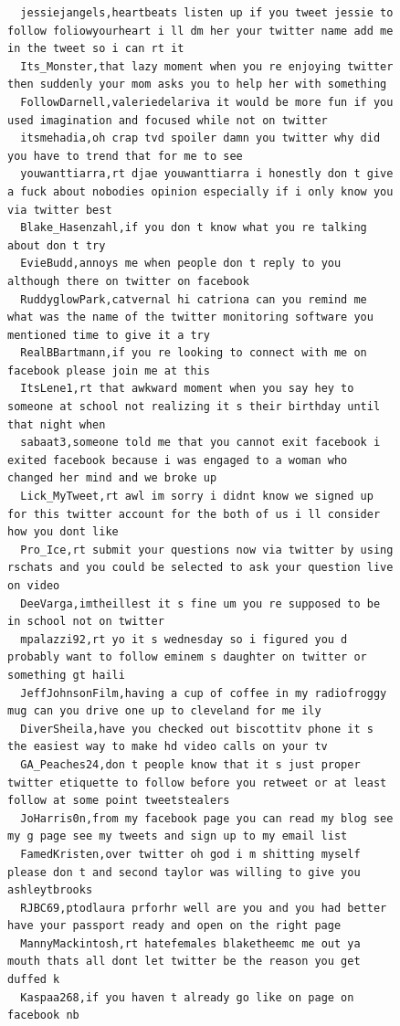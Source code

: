 \begin{figure}[htpb]
\begin{verbatim}
  jessiejangels,heartbeats listen up if you tweet jessie to follow foliowyourheart i ll dm her your twitter name add me in the tweet so i can rt it
  Its_Monster,that lazy moment when you re enjoying twitter then suddenly your mom asks you to help her with something
  FollowDarnell,valeriedelariva it would be more fun if you used imagination and focused while not on twitter
  itsmehadia,oh crap tvd spoiler damn you twitter why did you have to trend that for me to see
  youwanttiarra,rt djae youwanttiarra i honestly don t give a fuck about nobodies opinion especially if i only know you via twitter best
  Blake_Hasenzahl,if you don t know what you re talking about don t try
  EvieBudd,annoys me when people don t reply to you although there on twitter on facebook
  RuddyglowPark,catvernal hi catriona can you remind me what was the name of the twitter monitoring software you mentioned time to give it a try
  RealBBartmann,if you re looking to connect with me on facebook please join me at this
  ItsLene1,rt that awkward moment when you say hey to someone at school not realizing it s their birthday until that night when
  sabaat3,someone told me that you cannot exit facebook i exited facebook because i was engaged to a woman who changed her mind and we broke up
  Lick_MyTweet,rt awl im sorry i didnt know we signed up for this twitter account for the both of us i ll consider how you dont like
  Pro_Ice,rt submit your questions now via twitter by using rschats and you could be selected to ask your question live on video
  DeeVarga,imtheillest it s fine um you re supposed to be in school not on twitter
  mpalazzi92,rt yo it s wednesday so i figured you d probably want to follow eminem s daughter on twitter or something gt haili
  JeffJohnsonFilm,having a cup of coffee in my radiofroggy mug can you drive one up to cleveland for me ily
  DiverSheila,have you checked out biscottitv phone it s the easiest way to make hd video calls on your tv
  GA_Peaches24,don t people know that it s just proper twitter etiquette to follow before you retweet or at least follow at some point tweetstealers
  JoHarris0n,from my facebook page you can read my blog see my g page see my tweets and sign up to my email list
  FamedKristen,over twitter oh god i m shitting myself please don t and second taylor was willing to give you ashleytbrooks
  RJBC69,ptodlaura prforhr well are you and you had better have your passport ready and open on the right page
  MannyMackintosh,rt hatefemales blaketheemc me out ya mouth thats all dont let twitter be the reason you get duffed k
  Kaspaa268,if you haven t already go like on page on facebook nb

\end{verbatim}
\end{figure}
